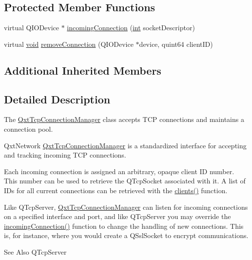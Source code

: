 \subsection*{Protected Member Functions}
\begin{DoxyCompactItemize}
\item 
virtual Q\-I\-O\-Device $\ast$ \hyperlink{class_qxt_tcp_connection_manager_a6134bf18757992452f83296b71c66ac3}{incoming\-Connection} (\hyperlink{ioapi_8h_a787fa3cf048117ba7123753c1e74fcd6}{int} socket\-Descriptor)
\item 
virtual \hyperlink{group___u_a_v_objects_plugin_ga444cf2ff3f0ecbe028adce838d373f5c}{void} \hyperlink{class_qxt_tcp_connection_manager_a21ea8c0e14068b79e968cdcbf6321e24}{remove\-Connection} (Q\-I\-O\-Device $\ast$device, quint64 client\-I\-D)
\end{DoxyCompactItemize}
\subsection*{Additional Inherited Members}


\subsection{Detailed Description}
The \hyperlink{class_qxt_tcp_connection_manager}{Qxt\-Tcp\-Connection\-Manager} class accepts T\-C\-P connections and maintains a connection pool. 

Qxt\-Network \hyperlink{class_qxt_tcp_connection_manager}{Qxt\-Tcp\-Connection\-Manager} is a standardized interface for accepting and tracking incoming T\-C\-P connections.

Each incoming connection is assigned an arbitrary, opaque client I\-D number. This number can be used to retrieve the Q\-Tcp\-Socket associated with it. A list of I\-Ds for all current connections can be retrieved with the \hyperlink{class_qxt_abstract_connection_manager_a3f56af8280c20210a4694d79a206d2bb}{clients()} function.

Like Q\-Tcp\-Server, \hyperlink{class_qxt_tcp_connection_manager}{Qxt\-Tcp\-Connection\-Manager} can listen for incoming connections on a specified interface and port, and like Q\-Tcp\-Server you may override the \hyperlink{class_qxt_tcp_connection_manager_a6134bf18757992452f83296b71c66ac3}{incoming\-Connection()} function to change the handling of new connections. This is, for instance, where you would create a Q\-Ssl\-Socket to encrypt communications.

\begin{DoxySeeAlso}{See Also}
Q\-Tcp\-Server 
\end{DoxySeeAlso}


